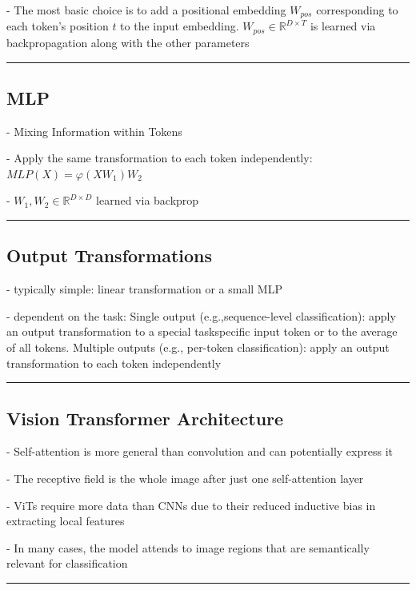 - The most basic choice is to add a positional embedding $W_{p o s}$ corresponding to each token's position $t$ to the input embedding. $W_{p o s}\in\mathbb{R}^{D\times T}$ is learned via backpropagation along with the other parameters

\vspace{4pt}
\hrule
\vspace{4pt}
\subsection{MLP}

- Mixing Information within Tokens

- Apply the same transformation to each token
independently: $M L P(X)=\varphi(X W_{1})W_{2}$

- $W_{1},W_{2}\in\mathbb{R}^{D\times D}$ learned via backprop

\vspace{4pt}
\hrule
\vspace{4pt}
\subsection{Output Transformations}

- typically simple: linear
transformation or a small MLP

- dependent on the task: Single output (e.g.,sequence-level classification): apply an output transformation to a special taskspecific input token or to the average of all tokens. Multiple outputs (e.g., per-token classification): apply an output transformation to each token independently

\vspace{4pt}
\hrule
\vspace{4pt}
\subsection{Vision Transformer Architecture}

- Self-attention is more general than convolution and can potentially express it

- The receptive field is the whole image after just one self-attention layer

- ViTs require more data than CNNs due to their reduced inductive bias in extracting local features

- In many cases, the model attends to image regions that are semantically relevant for classification

\vspace{4pt}
\hrule
\vspace{4pt}
